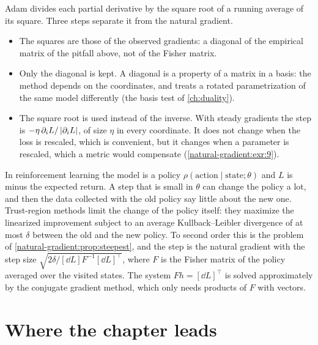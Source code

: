 \begin{notechapter}
\begin{mlthread}
Adam divides each partial derivative by the square root of a running
average of its square. Three steps separate it from the natural
gradient.
\begin{itemize}[nosep]
  \item The squares are those of the observed gradients: a diagonal of
        the empirical matrix of the pitfall above, not of the Fisher
        matrix.
  \item Only the diagonal is kept. A diagonal is a property of a matrix
        in a basis: the method depends on the coordinates, and treats a
        rotated parametrization of the same model differently
        (the basis test of \cref{ch:duality}).
  \item The square root is used instead of the inverse. With steady
        gradients the step is $-\eta\,\partial_iL/\left|\partial_iL\right|$, of
        size $\eta$ in every coordinate. It does not change when the
        loss is rescaled, which is convenient, but it changes when a
        parameter is rescaled, which a metric would compensate
        (\cref{natural-gradient:exr:9}).
\end{itemize}
\end{mlthread}

\begin{mlthread}
In reinforcement learning the model is a policy
$\rho(\text{action}\mid\text{state}; \theta)$ and $L$ is minus the
expected return. A step that is small in $\theta$ can change the policy
a lot, and then the data collected with the old policy say little about
the new one. Trust-region methods limit the change of the policy itself:
they maximize the linearized improvement subject to an average
Kullback--Leibler divergence of at most $\delta$ between the old and the
new policy. To second order this is the problem of
\cref{natural-gradient:prop:steepest}, and the step is the natural
gradient with the step size
$\sqrt{2\delta/[\dd L]F^{-1}[\dd L]^\top}$, where $F$ is the Fisher
matrix of the policy averaged over the visited states. The system
$Fh = [\dd L]^\top$ is solved approximately by the conjugate gradient
method, which only needs products of $F$ with vectors.
\end{mlthread}

\section{Where the chapter leads}\label{natural-gradient:sec:outlook}


\end{notechapter}

